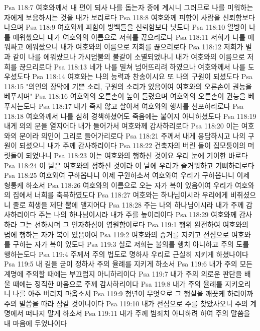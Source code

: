 Psa 118:7  여호와께서 내 편이 되사 나를 돕는자 중에 계시니 그러므로 나를 미워하는 자에게 보응하시는 것을 내가 보리로다
Psa 118:8  여호와께 피함이 사람을 신뢰함보다 나으며
Psa 118:9  여호와께 피함이 방백들을 신뢰함보다 낫도다
Psa 118:10  열방이 나를 에워쌌으니 내가 여호와의 이름으로 저희를 끊으리로다
Psa 118:11  저희가 나를 에워싸고 에워쌌으니 내가 여호와의 이름으로 저희를 끊으리로다
Psa 118:12  저희가 벌과 같이 나를 에워쌌으나 가시덤불의 불같이 소멸되었나니 내가 여호와의 이름으로 저희를 끊으리로다
Psa 118:13  네가 나를 밀쳐 넘어뜨리려 하였으나 여호와께서 나를 도우셨도다
Psa 118:14  여호와는 나의 능력과 찬송이시요 또 나의 구원이 되셨도다
Psa 118:15  "의인의 장막에 기쁜 소리, 구원의 소리가 있음이여 여호와의 오른손이 권능을 베푸시며"
Psa 118:16  여호와의 오른손이 높이 들렸으며 여호와의 오른손이 권능을 베푸시는도다
Psa 118:17  내가 죽지 않고 살아서 여호와의 행사를 선포하리로다
Psa 118:18  여호와께서 나를 심히 경책하셨어도 죽음에는 붙이지 아니하셨도다
Psa 118:19  내게 의의 문을 열지어다 내가 들어가서 여호와께 감사하리로다
Psa 118:20  이는 여호와의 문이라 의인이 그리로 들어가리로다
Psa 118:21  주께서 내게 응답하시고 나의 구원이 되셨으니 내가 주께 감사하리이다
Psa 118:22  건축자의 버린 돌이 집모퉁이의 머릿돌이 되었나니
Psa 118:23  이는 여호와의 행하신 것이요 우리 눈에 기이한 바로다
Psa 118:24  이 날은 여호와의 정하신 것이라 이 날에 우리가 즐거워하고 기뻐하리로다
Psa 118:25  여호와여 구하옵나니 이제 구원하소서 여호와여 우리가 구하옵나니 이제 형통케 하소서
Psa 118:26  여호와의 이름으로 오는 자가 복이 있음이여 우리가 여호와의 집에서 너희를 축복하였도다
Psa 118:27  여호와는 하나님이시라 우리에게 비취셨으니 줄로 희생을 제단 뿔에 맬지어다
Psa 118:28  주는 나의 하나님이시라 내가 주께 감사하리이다 주는 나의 하나님이시라 내가 주를 높이리이다
Psa 118:29  여호와께 감사하라 그는 선하시며 그 인자하심이 영원함이로다
Psa 119:1  행위 완전하여 여호와의 법에 행하는 자가 복이 있음이여
Psa 119:2  여호와의 증거를 지키고 전심으로 여호와를 구하는 자가 복이 있도다
Psa 119:3  실로 저희는 불의를 행치 아니하고 주의 도를 행하는도다
Psa 119:4  주께서 주의 법도로 명하사 우리로 근실히 지키게 하셨나이다
Psa 119:5  내 길을 굳이 정하사 주의 율례를 지키게 하소서
Psa 119:6  내가 주의 모든 계명에 주의할 때에는 부끄럽지 아니하리이다
Psa 119:7  내가 주의 의로운 판단을 배울 때에는 정직한 마음으로 주께 감사하리이다
Psa 119:8  내가 주의 율례를 지키오리니 나를 아주 버리지 마옵소서
Psa 119:9  청년이 무엇으로 그 행실을 깨끗케 하리이까 주의 말씀을 따라 삼갈 것이니이다
Psa 119:10  내가 전심으로 주를 찾았사오니 주의 계명에서 떠나지 말게 하소서
Psa 119:11  내가 주께 범죄치 아니하려 하여 주의 말씀을 내 마음에 두었나이다
